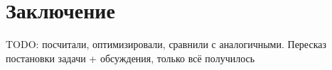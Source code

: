 \chapter{Заключение}

TODO: посчитали, оптимизировали, сравнили с аналогичными. Пересказ постановки задачи + обсуждения, только всё получилось